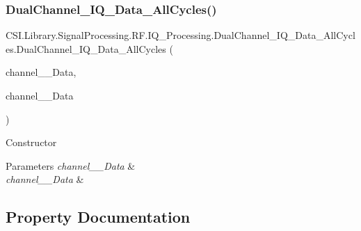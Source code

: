 \subsubsection{\texorpdfstring{DualChannel\_IQ\_Data\_AllCycles()}{DualChannel\_IQ\_Data\_AllCycles()}\hspace{0.1cm}{\footnotesize\ttfamily [2/2]}}
{\footnotesize\ttfamily C\+S\+I.\+Library.\+Signal\+Processing.\+R\+F.\+I\+Q\+\_\+\+Processing.\+Dual\+Channel\+\_\+\+I\+Q\+\_\+\+Data\+\_\+\+All\+Cycles.\+Dual\+Channel\+\_\+\+I\+Q\+\_\+\+Data\+\_\+\+All\+Cycles (\begin{DoxyParamCaption}\item[{\mbox{\hyperlink{class_c_s_i_1_1_library_1_1_signal_processing_1_1_r_f_1_1_i_q___processing_1_1_i_q___data___all_cycles}{I\+Q\+\_\+\+Data\+\_\+\+All\+Cycles}}}]{channel\+\_\+\_\+\+Data,  }\item[{\mbox{\hyperlink{class_c_s_i_1_1_library_1_1_signal_processing_1_1_r_f_1_1_i_q___processing_1_1_i_q___data___all_cycles}{I\+Q\+\_\+\+Data\+\_\+\+All\+Cycles}}}]{channel\+\_\+\_\+\+Data }\end{DoxyParamCaption})\hspace{0.3cm}{\ttfamily [inline]}}



Constructor 


\begin{DoxyParams}{Parameters}
{\em channel\+\_\+\_\+\+Data} & \\
\hline
{\em channel\+\_\+\_\+\+Data} & \\
\hline
\end{DoxyParams}


\subsection{Property Documentation}
\mbox{\label{class_c_s_i_1_1_library_1_1_signal_processing_1_1_r_f_1_1_i_q___processing_1_1_dual_channel___i_q___data___all_cycles_a09fc234a5e8c209487fa5b112fcadea5}} 
